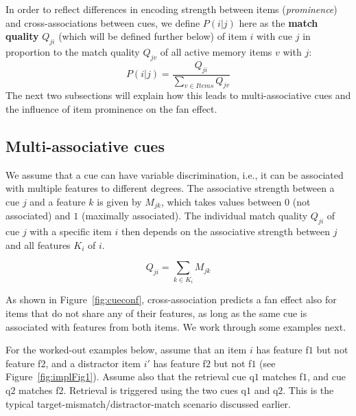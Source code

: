 \documentclass{cambridge7A}\usepackage[]{graphicx}\usepackage[]{color}
\begin{document}
In order to reflect differences in encoding strength between items (\emph{prominence}) and cross-associations between cues, we define $P(i|j)$ here as the  \textbf{match quality} $Q_{ji}$ (which will be defined further below) of item $i$ with cue $j$ in proportion to the match quality $Q_{jv}$ of all active memory items $v$ with $j$:
% 
\begin{equation} \label{eq:newfan}
	P(i|j) = \frac{Q_{ji}}{\sum\limits_{v \in Items} Q_{jv}}
\end{equation}
%
The next two subsections will explain how this leads to multi-associative cues and the influence of item prominence on the fan effect.


\subsection{Multi-associative cues}
We assume that a cue can have variable discrimination, i.e., it can be associated with multiple features to different degrees. The associative strength between a cue $j$ and a feature $k$ is given by $M_{jk}$, which takes values between $0$ (not associated) and $1$ (maximally associated). 
The individual match quality $Q_{ji}$ of cue $j$ with a specific item $i$ then depends on the associative strength between $j$ and all features $K_i$ of $i$. 

\begin{equation}
    Q_{ji} = \sum_{k \in K_i} M_{jk} \label{eq:Qji}
\end{equation}

As shown in Figure~\ref{fig:cueconf}, cross-association predicts a fan effect also for items that do not share any of their features, as long as the same cue is associated with features from both items. We work through some examples next.

For the worked-out examples below, assume that an item $i$ has feature f$1$ but not feature f$2$, and a distractor item $i'$ has feature f$2$ but not f$1$ (see Figure~\ref{fig:implFig1}). Assume also that the retrieval cue q$1$ matches f$1$, and cue q$2$ matches f$2$. Retrieval is triggered using the two cues q$1$ and q$2$. This is the typical target-mismatch/distractor-match scenario discussed earlier.
\end{document}
